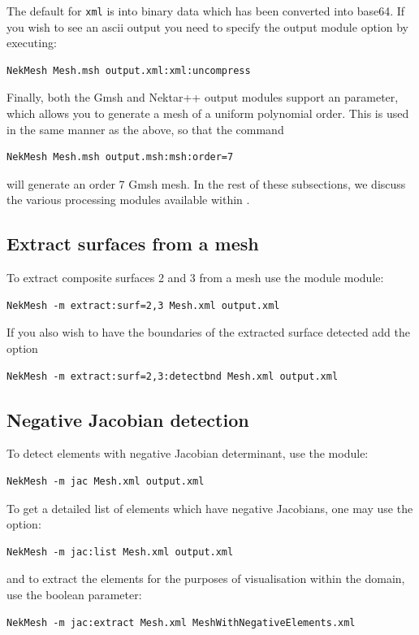 The default for \texttt{xml} is into binary data which has been
converted into base64. If you wish to see an ascii output you need to
specify the output module option  by executing:
%
\begin{lstlisting}[style=BashInputStyle]
NekMesh Mesh.msh output.xml:xml:uncompress
\end{lstlisting}
%
Finally, both the Gmsh and Nektar++ output modules support an 
parameter, which allows you to generate a mesh of a uniform polynomial
order. This is used in the same manner as the above, so that the command
%
\begin{lstlisting}[style=BashInputStyle]
NekMesh Mesh.msh output.msh:msh:order=7
\end{lstlisting}
%
will generate an order 7 Gmsh mesh. In the rest of these subsections, we discuss
the various processing modules available within \mc.

\subsection{Extract surfaces from a mesh}

To extract composite surfaces 2 and 3  from a mesh use the module 
module:
%
\begin{lstlisting}[style=BashInputStyle]
NekMesh -m extract:surf=2,3 Mesh.xml output.xml
\end{lstlisting}
%
If you also wish to have the boundaries of the extracted surface detected add the  option
%
\begin{lstlisting}[style=BashInputStyle]
NekMesh -m extract:surf=2,3:detectbnd Mesh.xml output.xml
\end{lstlisting}

\subsection{Negative Jacobian detection}

To detect elements with negative Jacobian determinant, use the 
module:
%
\begin{lstlisting}[style=BashInputStyle]
NekMesh -m jac Mesh.xml output.xml
\end{lstlisting}
%
To get a detailed list of elements which have negative Jacobians, one may use
the  option:
%
\begin{lstlisting}[style=BashInputStyle]
NekMesh -m jac:list Mesh.xml output.xml
\end{lstlisting}
%
and to extract the elements for the purposes of visualisation within the domain,
use the  boolean parameter:
%
\begin{lstlisting}[style=BashInputStyle]
NekMesh -m jac:extract Mesh.xml MeshWithNegativeElements.xml
\end{lstlisting}

